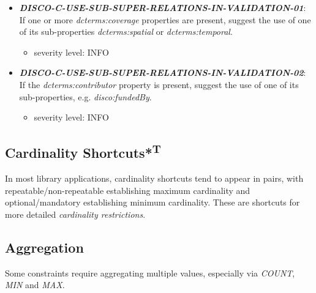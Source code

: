 \documentclass{llncs}
\begin{document}
\begin{itemize}
	\item \textbf{{\em DISCO-C-USE-SUB-SUPER-RELATIONS-IN-VALIDATION-01}}: 
	If one or more \emph{dcterms:coverage} properties are present, suggest the use of one of its sub-properties \emph{dcterms:spatial} or \emph{dcterms:temporal}.
		\begin{itemize}
		\item severity level: INFO
	\end{itemize}
	\item \textbf{{\em DISCO-C-USE-SUB-SUPER-RELATIONS-IN-VALIDATION-02}}: 
	If the \emph{dcterms:contributor} property is present, suggest the use of one of its sub-properties, e.g. \emph{disco:fundedBy}.
		\begin{itemize}
		\item severity level: INFO
	\end{itemize}
\end{itemize}

\subsection{Cardinality Shortcuts*\textsuperscript{T}}

In most library applications, cardinality shortcuts tend to appear in pairs, with repeatable/non-repeatable establishing maximum cardinality and optional/mandatory establishing minimum cardinality.
These are shortcuts for more detailed \emph{cardinality restrictions}.

\subsection{Aggregation}

Some constraints require aggregating multiple values, especially via \emph{COUNT}, \emph{MIN} and \emph{MAX}.
\end{document}
